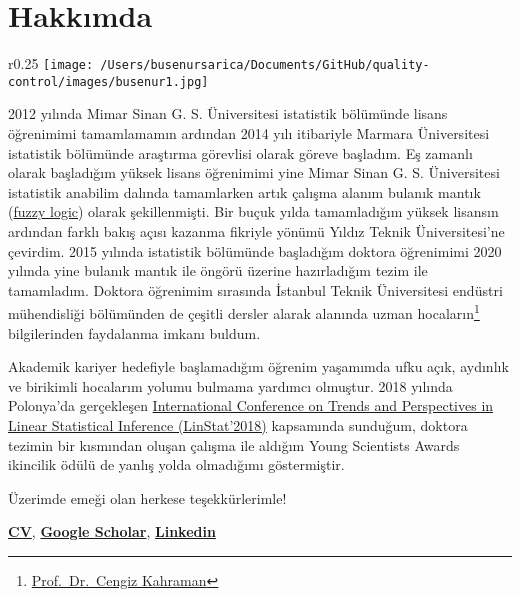 \documentclass[
]{book}
\begin{document}
\hypertarget{hakkux131mda}{%
\section{Hakkımda}\label{hakkux131mda}}

\begin{wrapfigure}{r}{0.25\textwidth}
\texttt{[image: /Users/busenursarica/Documents/GitHub/quality-control/images/busenur1.jpg]}
\end{wrapfigure}

2012 yılında Mimar Sinan G. S. Üniversitesi istatistik bölümünde lisans öğrenimimi tamamlamamın ardından 2014 yılı itibariyle Marmara Üniversitesi istatistik bölümünde araştırma görevlisi olarak göreve başladım. Eş zamanlı olarak başladığım yüksek lisans öğrenimimi yine Mimar Sinan G. S. Üniversitesi istatistik anabilim dalında tamamlarken artık çalışma alanım bulanık mantık (\href{https://en.wikipedia.org/wiki/Fuzzy_logic}{fuzzy logic}) olarak şekillenmişti. Bir buçuk yılda tamamladığım yüksek lisansın ardından farklı bakış açısı kazanma fikriyle yönümü Yıldız Teknik Üniversitesi'ne çevirdim. 2015 yılında istatistik bölümünde başladığım doktora öğrenimimi 2020 yılında yine bulanık mantık ile öngörü üzerine hazırladığım tezim ile tamamladım. Doktora öğrenimim sırasında İstanbul Teknik Üniversitesi endüstri mühendisliği bölümünden de çeşitli dersler alarak alanında uzman hocaların\footnote{\href{http://akademi.itu.edu.tr/kahramanc/}{Prof.~Dr.~Cengiz Kahraman}} bilgilerinden faydalanma imkanı buldum.

Akademik kariyer hedefiyle başlamadığım öğrenim yaşamımda ufku açık, aydınlık ve birikimli hocalarım yolumu bulmama yardımcı olmuştur. 2018 yılında Polonya'da gerçekleşen \href{http://www.linstat2018.put.poznan.pl/ysa.html}{International Conference on Trends and Perspectives in Linear Statistical Inference (LinStat'2018)} kapsamında sunduğum, doktora tezimin bir kısmından oluşan çalışma ile aldığım Young Scientists Awards ikincilik ödülü de yanlış yolda olmadığımı göstermiştir.

Üzerimde emeği olan herkese teşekkürlerimle!

\vspace{0.3cm}

\href{https://avesis.marmara.edu.tr/busenur.sarica}{\textbf{CV}}, \href{https://scholar.google.com.tr/citations?user=OKlYJEgAAAAJ\&hl=tr}{\textbf{Google Scholar}}, \href{https://www.linkedin.com/in/busenur-kızılaslan-795ab54a}{\textbf{Linkedin}}
\end{document}
